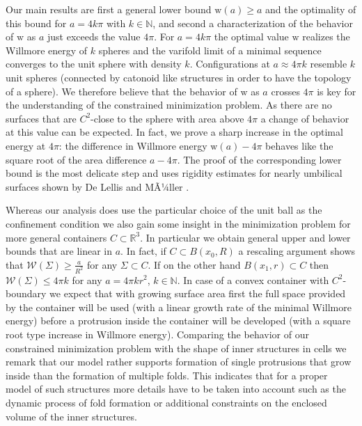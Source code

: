 \documentclass[reqno,makeidx,12pt]{amsart}
\theoremstyle{note}
\theoremstyle{definition}
\begin{document}
Our main results are first a general lower bound ${\text{w}}(a)\geq a$ and the optimality of this bound for $a=4k\pi$ with $k\in{\ensuremath{\mathbb{N}}}$, and second a characterization of the behavior of ${\text{w}}$ as $a$ just exceeds the value $4\pi$. For $a=4k\pi$ the optimal value ${\text{w}}$ realizes the Willmore energy of $k$ spheres and the varifold limit of a minimal sequence converges to the unit sphere with density $k$. Configurations at $a\approx 4\pi k$ resemble $k$ unit spheres (connected by catonoid like structures in order to have the topology of a sphere). We therefore believe that the behavior of ${\text{w}}$ as $a$ crosses $4\pi$ is key for the understanding of the constrained minimization problem. As there are no surfaces that are $C^2$-close to the sphere with area above $4\pi$ a change of behavior at this value can be expected. In fact, we prove a sharp increase in the optimal energy at $4\pi$: the difference in Willmore energy ${\text{w}}(a)-4\pi$ behaves like the square root of the area difference $a-4\pi$. The proof of the corresponding lower bound is the most delicate step and uses rigidity estimates for nearly umbilical surfaces shown by De Lellis and MÃ¼ller \cite{DeMu05,DeMu06}.

Whereas our analysis does use the particular choice of the unit ball as the confinement condition we also gain some insight in the minimization problem for more general containers $C\subset{\mathbb R}^3$. In particular we obtain general upper and lower bounds that are linear in $a$. In fact, if $C\subset B(x_0,R)$ a rescaling argument shows that ${\mathcal{W}}(\Sigma)\geq \frac{a}{R^2}$ for any $\Sigma\subset  C$. If on the other hand $B(x_1,r)\subset C$ then ${\mathcal{W}}(\Sigma)\leq 4\pi k$ for any $a=4\pi k r^2$, $k\in{\ensuremath{\mathbb{N}}}$. In case of a convex container with $C^2$-boundary we expect that with growing surface area first the full space provided by the container will be used (with a linear growth rate of the minimal Willmore energy) before a protrusion inside the container will be developed (with a square root type increase in Willmore energy).
Comparing the behavior of our constrained minimization problem with the shape of inner structures in cells we remark that our model rather supports formation of single protrusions that grow inside than the formation of multiple folds. This indicates that for a proper model of such structures more details have to be taken into account such as the dynamic process of fold formation or additional constraints on the enclosed volume of the inner structures.
\end{document}
